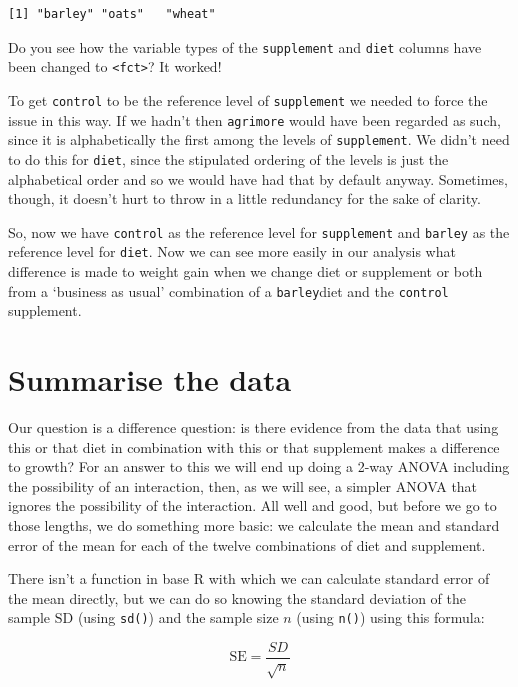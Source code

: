 \documentclass[
  letterpaper,
  DIV=11,
  numbers=noendperiod]{scrreprt}
\begin{document}
\begin{verbatim}
[1] "barley" "oats"   "wheat" 
\end{verbatim}

Do you see how the variable types of the \texttt{supplement} and
\texttt{diet} columns have been changed to
\texttt{\textless{}fct\textgreater{}}? It worked!

To get \texttt{control} to be the reference level of \texttt{supplement}
we needed to force the issue in this way. If we hadn't then
\texttt{agrimore} would have been regarded as such, since it is
alphabetically the first among the levels of \texttt{supplement}. We
didn't need to do this for \texttt{diet}, since the stipulated ordering
of the levels is just the alphabetical order and so we would have had
that by default anyway. Sometimes, though, it doesn't hurt to throw in a
little redundancy for the sake of clarity.

So, now we have \texttt{control} as the reference level for
\texttt{supplement} and \texttt{barley} as the reference level for
\texttt{diet}. Now we can see more easily in our analysis what
difference is made to weight gain when we change diet or supplement or
both from a `business as usual' combination of a \texttt{barley}diet and
the \texttt{control} supplement.

\section{Summarise the data}\label{summarise-the-data-2}

Our question is a difference question: is there evidence from the data
that using this or that diet in combination with this or that supplement
makes a difference to growth? For an answer to this we will end up doing
a 2-way ANOVA including the possibility of an interaction, then, as we
will see, a simpler ANOVA that ignores the possibility of the
interaction. All well and good, but before we go to those lengths, we do
something more basic: we calculate the mean and standard error of the
mean for each of the twelve combinations of diet and supplement.

There isn't a function in base R with which we can calculate standard
error of the mean directly, but we can do so knowing the standard
deviation of the sample \(\text{SD}\) (using \texttt{sd()}) and the
sample size \(n\) (using \texttt{n()}) using this formula:

\[ \text{SE}=\frac{SD}{\sqrt{n}}\]
\end{document}
